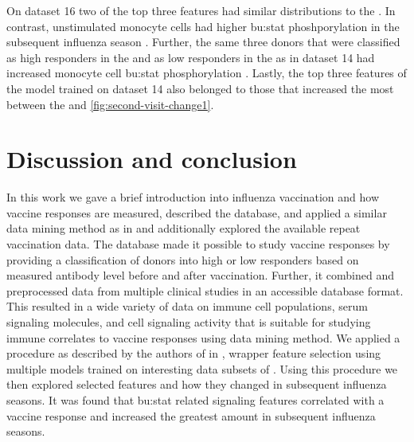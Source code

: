 On dataset 16 two of the top three features had similar distributions to the \firstvis {}.
In contrast, unstimulated monocyte cells had higher \gls{bu:stat} phoshporylation in the subsequent influenza season .
Further, the same three donors that were classified as high responders in the \firstvis and as low responders in the \secondvis as in dataset 14  had increased monocyte cell \gls{bu:stat} phosphorylation .
Lastly, the top three features of the model trained on dataset 14 also belonged to those that increased the most between the \firstvis and \secondvis \autoref{fig:second-visit-change1}.

\section{Discussion and conclusion}

In this work we gave a brief introduction into influenza vaccination and how vaccine responses are measured, described the \flup database, and applied a similar data mining method as in \spaper and additionally explored the available repeat vaccination data.
The \flup database made it possible to study vaccine responses by providing a classification of donors into high or low responders based on measured antibody level before and after vaccination.
Further, it combined and preprocessed data from multiple clinical studies in an accessible database format.
This resulted in a wide variety of data on immune cell populations, serum signaling molecules, and cell signaling activity that is suitable for studying immune correlates to vaccine responses using data mining method.
We applied a procedure as described by the authors of \flup in \spaper, wrapper feature selection using multiple models trained on interesting data subsets of \flup. Using this procedure we then explored selected features and how they changed in subsequent influenza seasons.
It was found that \gls{bu:stat} related signaling features correlated with a vaccine response and increased the greatest amount in subsequent influenza seasons.

